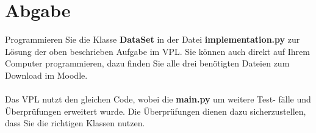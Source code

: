 \documentclass{scrartcl}
\begin{document}
\section[Abgabe]{Abgabe}
Programmieren Sie die Klasse \textbf{DataSet} in der Datei \textbf{implementation.py} zur 
Lösung der oben beschrieben Aufgabe im VPL. Sie können auch direkt auf
Ihrem Computer programmieren, dazu finden Sie alle drei benötigten Dateien
zum Download im Moodle.
\\
\\
Das VPL nutzt den gleichen Code, wobei die \textbf{main.py} um weitere Test-
fälle und Überprüfungen erweitert wurde. Die Überprüfungen dienen dazu
sicherzustellen, dass Sie die richtigen Klassen nutzen.
\end{document}
